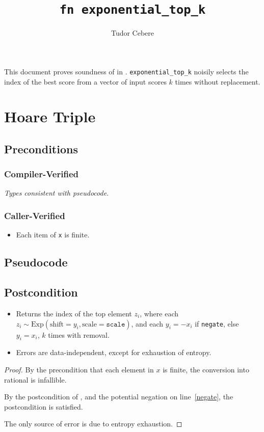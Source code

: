\documentclass{article}
\title{\texttt{fn exponential\_top\_k}}
\author{Tudor Cebere}
\begin{document}
\maketitle\contrib
This document proves soundness of  in . 
\texttt{exponential\_top\_k} noisily selects the index of the best score from a vector of input scores $k$ times without replacement.

\section{Hoare Triple}
\subsection*{Preconditions}
\subsubsection*{Compiler-Verified}
\textit{Types consistent with pseudocode.}

\subsubsection*{Caller-Verified}
\begin{itemize}
    \item Each item of \texttt{x} is finite.
\end{itemize}

\subsection*{Pseudocode}
\label{sec:python-pseudocode}


\subsection*{Postcondition}
\begin{theorem}
    \label{postcondition}
    \begin{itemize}
        \item Returns the index of the top element $z_i$,
        where each $z_i \sim \mathrm{Exp}(\mathrm{shift}=y_i, \mathrm{scale}=\texttt{scale})$,
        and each $y_i = -x_i$ if \texttt{negate}, else $y_i = x_i$,
        $k$ times with removal.
        \item Errors are data-independent, except for exhaustion of entropy.
    \end{itemize}
\end{theorem}

\begin{proof}
    By the precondition that each element in $x$ is finite,
    the conversion into rational is infallible.
    
    By the postcondition of ,
    and the potential negation on line~\ref{negate},
    the postcondition is satisfied.

    The only source of error is due to entropy exhaustion.
\end{proof}
\end{document}
